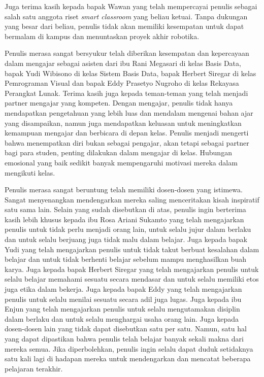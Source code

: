 \documentclass{kti}
\begin{document}
{Juga terima kasih kepada bapak Wawan yang telah mempercayai penulis sebagai salah satu anggota riset \textit{smart classroom} yang beliau ketuai. Tanpa dukungan yang besar dari beliau, penulis tidak akan memiliki kesempatan untuk dapat bermalam di kampus dan menuntaskan proyek akhir robotika.

Penulis merasa sangat bersyukur telah diberikan kesempatan dan kepercayaan dalam mengajar sebagai asisten dari ibu Rani Megasari di kelas Basis Data, bapak Yudi Wibisono di kelas Sistem Basis Data, bapak Herbert Siregar di kelas Pemrograman Visual dan bapak Eddy Prasetyo Nugroho di kelas Rekayasa Perangkat Lunak. Terima kasih juga kepada teman-teman yang telah menjadi partner mengajar yang kompeten. Dengan mengajar, penulis tidak hanya mendapatkan pengetahuan yang lebih luas dan mendalam mengenai bahan ajar yang disampaikan, namun juga mendapatkan keluasan untuk meningkatkan kemampuan mengajar dan berbicara di depan kelas. Penulis menjadi mengerti bahwa menempatkan diri bukan sebagai pengajar, akan tetapi sebagai partner bagi para studen, penting dilakukan dalam mengajar di kelas. Hubungan emosional yang baik sedikit banyak mempengaruhi motivasi mereka dalam mengikuti kelas.

Penulis merasa sangat beruntung telah memiliki dosen-dosen yang istimewa. Sangat menyenangkan mendengarkan mereka saling menceritakan kisah inspiratif satu sama lain. Selain yang sudah disebutkan di atas, penulis ingin berterima kasih lebih khusus kepada ibu Rosa Ariani Sukamto yang telah mengajarkan penulis untuk tidak perlu menjadi orang lain, untuk selalu jujur dalam berlaku dan untuk selalu berjuang juga tidak malu dalam belajar. Juga kepada bapak Yudi yang telah mengajarkan penulis untuk tidak takut berbuat kesalahan dalam belajar dan untuk tidak berhenti belajar sebelum mampu menghasilkan buah karya. Juga kepada bapak Herbert Siregar yang telah mengajarkan penulis untuk selalu belajar memahami sesuatu secara mendasar dan untuk selalu memiliki etos juga etika dalam bekerja. Juga kepada bapak Eddy yang telah mengajarkan penulis untuk selalu menilai sesuatu secara adil juga lugas. Juga kepada ibu Enjun yang telah mengajarkan penulis untuk selalu mengutamakan disiplin dalam berlaku dan untuk selalu menghargai usaha orang lain. Juga kepada dosen-dosen lain yang tidak dapat disebutkan satu per satu. Namun, satu hal yang dapat dipastikan bahwa penulis telah belajar banyak sekali makna dari mereka semua. Jika diperbolehkan, penulis ingin selalu dapat duduk setidaknya satu kali lagi di hadapan mereka untuk mendengarkan dan mencatat beberapa pelajaran terakhir.

}
\end{document}

